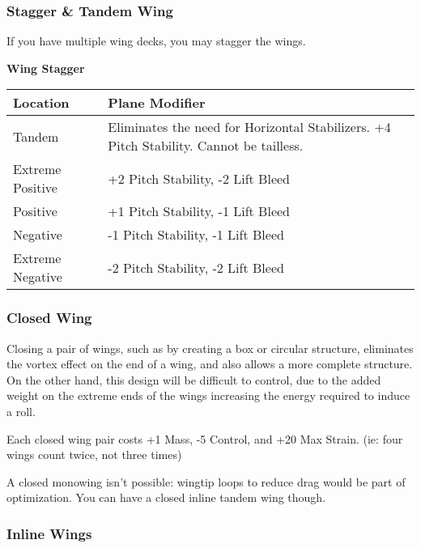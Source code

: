 \documentclass{article}
\begin{document}
\subsubsection{Stagger \& Tandem Wing}
\label{_Stagger \& Tandem Wing}

If you have multiple wing decks, you may stagger the wings.

\textbf{Wing Stagger}

\begin{tabular}{|l|l|}
    \hline
    Location         & Plane Modifier                                           \\\hline
    Tandem           & Eliminates the need for Horizontal Stabilizers. +4 Pitch
    Stability. Cannot be tailless.                                              \\\hline
    Extreme Positive & +2 Pitch Stability, -2 Lift Bleed                        \\\hline
    Positive         & +1 Pitch Stability, -1 Lift Bleed                        \\\hline
    Negative         & -1 Pitch Stability, -1 Lift Bleed                        \\\hline
    Extreme Negative & -2 Pitch Stability, -2 Lift Bleed                        \\\hline
\end{tabular}

\subsubsection{Closed Wing}
\label{_Closed Wing}

Closing a pair of wings, such as by creating a box or circular
structure, eliminates the vortex effect on the end of a wing, and also
allows a more complete structure. On the other hand, this design will be
difficult to control, due to the added weight on the extreme ends of the
wings increasing the energy required to induce a roll.

Each closed wing pair costs +1 Mass, -5 Control, and +20 Max Strain.
(ie: four wings count twice, not three times)

A closed monowing isn't possible: wingtip loops to reduce drag would be
part of optimization. You can have a closed inline tandem wing though.

\subsubsection{Inline Wings}
\label{_Inline Wings}
\end{document}
